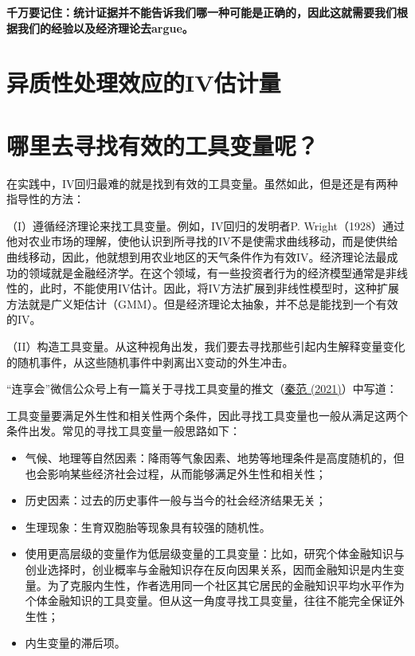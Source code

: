 \documentclass[cn,12pt,math=newtx,citestyle=gb7714-2015,bibstyle=gb7714-2015]{elegantbook}
\begin{document}
	\textbf{千万要记住：统计证据并不能告诉我们哪一种可能是正确的，因此这就需要我们根据我们的经验以及经济理论去argue。}
	
	
   \section{异质性处理效应的IV估计量}



	\section{哪里去寻找有效的工具变量呢？}
	
	在实践中，IV回归最难的就是找到有效的工具变量。虽然如此，但是还是有两种指导性的方法：
	
	（I）遵循经济理论来找工具变量。例如，IV回归的发明者P. Wright（1928）通过他对农业市场的理解，使他认识到所寻找的IV不是使需求曲线移动，而是使供给曲线移动，因此，他就想到用农业地区的天气条件作为有效IV。经济理论法最成功的领域就是金融经济学。在这个领域，有一些投资者行为的经济模型通常是非线性的，此时，不能使用IV估计。因此，将IV方法扩展到非线性模型时，这种扩展方法就是广义矩估计（GMM）。但是经济理论太抽象，并不总是能找到一个有效的IV。
	
	（II）构造工具变量。从这种视角出发，我们要去寻找那些引起内生解释变量变化的随机事件，从这些随机事件中剥离出X变动的外生冲击。
	
	“连享会”微信公众号上有一篇关于寻找工具变量的推文（\href{https://www.lianxh.cn/news/946348365bb2d.html}{秦范 (2021)}）中写道：
	
	工具变量要满足外生性和相关性两个条件，因此寻找工具变量也一般从满足这两个条件出发。常见的寻找工具变量一般思路如下：
	
	\begin{itemize}
		\item 气候、地理等自然因素：降雨等气象因素、地势等地理条件是高度随机的，但也会影响某些经济社会过程，从而能够满足外生性和相关性；
			\item 历史因素：过去的历史事件一般与当今的社会经济结果无关；
			\item 生理现象：生育双胞胎等现象具有较强的随机性。
		\item 	使用更高层级的变量作为低层级变量的工具变量：比如，研究个体金融知识与创业选择时，创业概率与金融知识存在反向因果关系，因而金融知识是内生变量。为了克服内生性，作者选用同一个社区其它居民的金融知识平均水平作为个体金融知识的工具变量。但从这一角度寻找工具变量，往往不能完全保证外生性；
			\item 内生变量的滞后项。
	\end{itemize}
	
\end{document}

